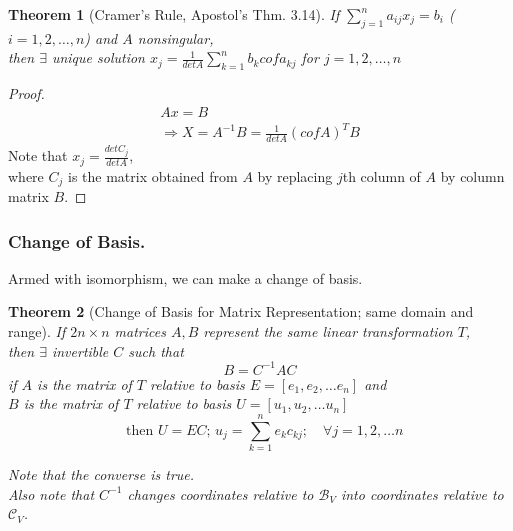 \documentclass[twoside]{amsart}
\theoremstyle{plain}
\newtheorem{theorem}{Theorem}
\theoremstyle{definition}
\begin{document}
\begin{theorem}[Cramer's Rule, Apostol's Thm. 3.14]
  If $\sum_{j=1}^n a_{ij} x_j  = b_i$ ($i = 1,2,\dots, n$) and $A$ nonsingular, \\
  \quad then $\exists$ unique solution $x_j = \frac{1}{det{A}} \sum_{k=1}^n b_k cof{a_{kj}}$ for $j=1,2,\dots, n$
\end{theorem}
\begin{proof}
  \[
\begin{gathered}
  Ax = B \\
  \Longrightarrow X = A^{-1}B = \frac{1}{det{A}} (cof{A})^T B 
\end{gathered}
\]
Note that $x_j = \frac{ det{C_j}}{det{A}}$, \\
\quad where $C_j$ is the matrix obtained from $A$ by replacing $j$th column of $A$ by column matrix $B$.  
\end{proof}

\subsubsection{Change of Basis.}

Armed with isomorphism, we can make a change of basis.  

\begin{theorem}[Change of Basis for Matrix Representation; same domain and range]\label{T:Change_of_basis_for_Matrix_Representation_same_domain_range}
If $2 n\times n $ matrices $A, B$ represent the same linear transformation $T$, \\
\phantom{If} then $\exists$ invertible $C$ such that 
\begin{equation}
  B=C^{-1} A C 
\end{equation}
if $A$ is the matrix of $T$ relative to basis $E = [e_1, e_2, \dots e_n ] $ and \\
\phantom{if} $B$ is the matrix of $T$ relative to basis $U = [u_1, u_2, \dots u_n ] $ \\
\begin{equation}\label{E:U=EC_Change_of_Basis}
\phantom{i} \text{ then }U=EC; \, u_j = \sum_{k=1}^n e_k c_{kj} ; \quad \forall j = 1,2,\dots n
\end{equation}

Note that the converse is true. \\  
Also note that $C^{-1}$ changes coordinates relative to $\mathcal{B}_V$ into coordinates relative to $\mathcal{C}_V$.  
\end{theorem}
\end{document}
